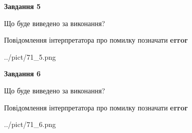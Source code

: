 \documentclass[12pt, ukrainian]{article}
\begin{document}
{{\begin {center}\textbf{Завдання 5}\end {center}}\par
Що буде виведено за виконання? \par
Повідомлення інтерпретатора про помилку позначати \textbf{error}

\begin{center}
	{../pict/71_5.png}
\end{center}
\newpage

{\begin {center}\textbf{Завдання 6}\end {center}}\par
Що буде виведено за виконання? \par
Повідомлення інтерпретатора про помилку позначати \textbf{error}

\begin{center}
	{../pict/71_6.png}
\end{center}
\newpage

}
\end{document}

